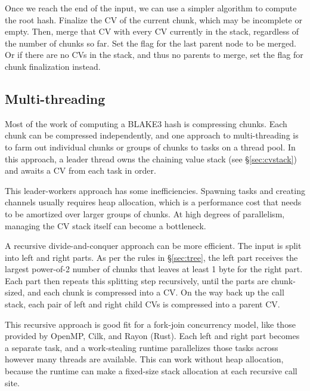 \documentclass[11pt,notitlepage,a4paper]{article}
\newcommand{\flag}[1]{\texttt{\detokenize{#1}}\xspace}
\begin{document}
Once we reach the end of the input, we can use a simpler algorithm to compute
the root hash. Finalize the CV of the current chunk, which may be incomplete or
empty. Then, merge that CV with every CV currently in the stack, regardless of
the number of chunks so far. Set the \flag{ROOT} flag for the last parent node
to be merged. Or if there are no CVs in the stack, and thus no parents to
merge, set the \flag{ROOT} flag for chunk finalization instead.

\subsection{Multi-threading}\label{sec:multithreading}

Most of the work of computing a BLAKE3 hash is compressing chunks. Each chunk
can be compressed independently, and one approach to multi-threading is to farm
out individual chunks or groups of chunks to tasks on a thread pool. In this
approach, a leader thread owns the chaining value stack (see
\S\ref{sec:cvstack}) and awaits a CV from each task in order.

This leader-workers approach has some inefficiencies. Spawning tasks and
creating channels usually requires heap allocation, which is a performance cost
that needs to be amortized over larger groups of chunks. At high degrees of
parallelism, managing the CV stack itself can become a bottleneck.

A recursive divide-and-conquer approach can be more efficient. The input is
split into left and right parts. As per the rules in \S\ref{sec:tree}, the left
part receives the largest power-of-2 number of chunks that leaves at least 1
byte for the right part. Each part then repeats this splitting step
recursively, until the parts are chunk-sized, and each chunk is compressed into
a CV. On the way back up the call stack, each pair of left and right child CVs
is compressed into a parent CV.

This recursive approach is good fit for a fork-join concurrency model, like
those provided by OpenMP, Cilk, and Rayon (Rust). Each left and right part
becomes a separate task, and a work-stealing runtime parallelizes those tasks
across however many threads are available. This can work without heap
allocation, because the runtime can make a fixed-size stack allocation at each
recursive call site.
\end{document}
